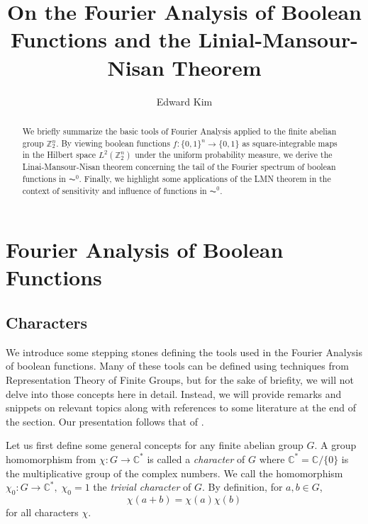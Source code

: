 \documentclass{amsart}
\theoremstyle{definition}
\theoremstyle{remark}
\numberwithin{equation}{section}
\theoremstyle{remark}
\begin{document}
\title{On the Fourier Analysis of Boolean Functions and the Linial-Mansour-Nisan Theorem}

\author{Edward Kim}

\begin{abstract}
  We briefly summarize the basic tools of Fourier Analysis applied to the finite abelian group $\mathbb{Z}_2^n$. By viewing boolean functions $f:\{0,1\}^n \rightarrow \{0,1\}$ as square-integrable maps in the Hilbert space $L^2(\mathbb{Z}_2^n)$ under the uniform probability measure, we derive the Linai-Mansour-Nisan theorem concerning the tail of the Fourier spectrum of boolean functions in $\AC^0$. Finally, we highlight some applications of the LMN theorem in the context of sensitivity and influence of functions in $\AC^0$.
\end{abstract}

\maketitle

\section{Fourier Analysis of Boolean Functions}

\subsection{Characters}
We introduce some stepping stones defining the tools used in the Fourier Analysis of boolean functions. Many of these tools can be defined using techniques from Representation Theory of Finite Groups, but for the sake of briefity, we will not delve into those concepts here in detail. Instead, we will provide remarks and snippets on relevant topics along with references to some literature at the end of the section. Our presentation follows that of \cite{hatami}. \newline

Let us first define some general concepts for any finite abelian group $G$. A group homomorphism from $\chi: G \rightarrow \mathbb{C}^*$ is called a \emph{character} of $G$ where $\mathbb{C}^* = \mathbb{C}/\{0\}$ is the multiplicative group of the complex numbers. We call the homomorphism $\chi_0:G \rightarrow \mathbb{C}^*, \; \chi_0 = 1$ the \emph{trivial character} of $G$. By definition, for $a,b \in G$,
\begin{equation} \label{homo}
\chi(a + b) = \chi(a)\chi(b)
\end{equation}
for all characters $\chi$. \newline
\end{document}
